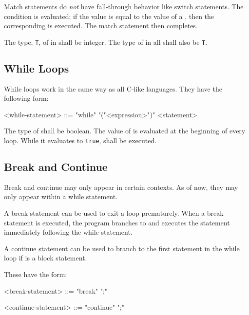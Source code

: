 Match statements do \textit{not} have fall-through behavior like switch statements. The condition  is evaluated; if the value is equal to the value of a , then the corresponding  is executed. The match statement then completes.

The type, \texttt{T}, of  in  shall be integer. The type of  in all  shall also be \texttt{T}.

\subsection{While Loops} \label{guide:while_stmt}

While loops work in the same way as all C-like languages. They have the following form:

\begin{minip}
\begin{grammar}
<while-statement> ::= "while" "("<expression>")" <statement>
\end{grammar}
\end{minip}

The type of  shall be boolean. The value of  is evaluated at the beginning of every loop. While it evaluates to \texttt{true},  shall be executed. 

\subsection{Break and Continue} \label{guide:break_continue}

Break and continue may only appear in certain contexts. As of now, they may only appear within a while statement.

A break statement can be used to exit a loop prematurely. When a break statement is executed, the program branches to and executes the statement immediately following the while statement.

A continue statement can be used to branch to the first statement in the while loop if  is a block statement. 

These have the form:

\begin{minip}
\begin{grammar}
<break-statement> ::= "break" ";"

<continue-statement> ::= "continue" ";"
\end{grammar}
\end{minip}

